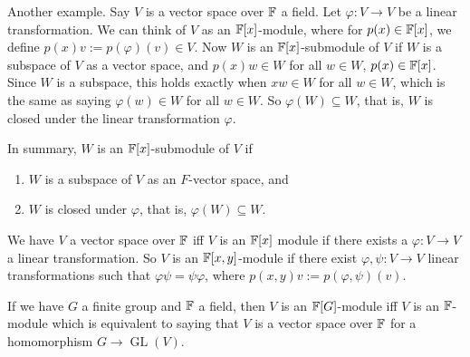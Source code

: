 \begin{example}
    Another example. Say $V$ is a vector space over $\mathbb{F}$ a field. Let $\varphi \colon V \to V$ be a linear transformation. We can think of $V$ as an $\mathbb{F}[x]$-module, where for $p(x)\in \mathbb{F}[x]$, we define $p(x)v:=p(\varphi )(v)\in V$. Now $W$ is an $\mathbb{F}[x]$-submodule of $V$ if $W$ is a subspace of $V$ as a vector space, and $p(x)w\in W$ for all $w\in W$, $p(x)\in \mathbb{F}[x]$. Since $W$ is a subspace, this holds exactly when $xw\in W$ for all $w\in W$, which is the same as saying $\varphi (w)\in W$ for all $w\in W$. So $\varphi (W)\subseteq W$, that is, $W$ is closed under the linear transformation $\varphi $. 

    In summary, $W$ is an $\mathbb{F}[x]$-submodule of $V$ if
    \begin{enumerate}
        \item $W$ is a subspace of $V$ as an $F$-vector space, and
        \item $W$ is closed under $\varphi $, that is, $\varphi (W)\subseteq W$.
    \end{enumerate}
\end{example}
\begin{example}
    We have $V$ a vector space over $\mathbb{F}$ iff $V$ is an $\mathbb{F}[x]$ module if there exists a $\varphi \colon V \to V$ a linear transformation. So $V$ is an $\mathbb{F}[x,y]$-module if there exist $\varphi ,\psi \colon V \to V$ linear transformations such that $\varphi \psi =\psi \varphi $, where $p(x,y)v:=p (\varphi ,\psi)(v)$.
\end{example}
\begin{example}
    If we have $G$ a finite group and $\mathbb{F}$ a field, then $V$ is an $\mathbb{F}[G]$-module iff $V$ is an $\mathbb{F}$-module which is equivalent to saying that $V$ is a vector space over $\mathbb{F}$ for a  homomorphism $G \to \operatorname{GL}(V)$.
\end{example}


